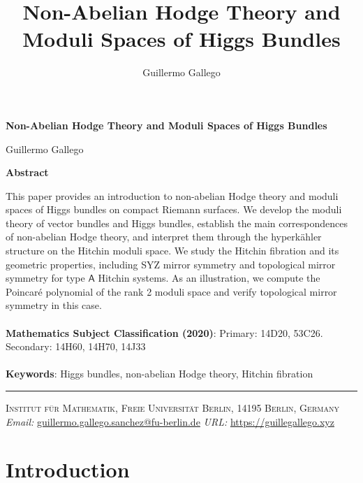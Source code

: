 \documentclass[12pt,a4paper]{amsbook}
\title{Non-Abelian Hodge Theory and Moduli Spaces of Higgs Bundles}
\author{Guillermo Gallego}
\theoremstyle{remark} \newtheorem{rmk}[thm]{Remark}
\theoremstyle{definition} \newtheorem{defn}[thm]{Definition}
\theoremstyle{definition} \newtheorem{ex}[thm]{Example}
\theoremstyle{definition} \newtheorem{ej}{Exercise}
\begin{document}
\begin{titlepage}
\setcounter{page}{1}
\thispagestyle{empty}
\begin{center}
\Huge \bfseries Non-Abelian Hodge Theory and Moduli Spaces of Higgs Bundles\par\vspace{2em}
\Large Guillermo Gallego \par\bigskip
\end{center}

\vspace{7em}

\begin{center}
\textbf{Abstract}
\end{center}
This paper provides an introduction to non-abelian Hodge theory and moduli spaces of Higgs bundles on compact Riemann surfaces. We develop the moduli theory of vector bundles and Higgs bundles, establish the main correspondences of non-abelian Hodge theory, and interpret them through the hyperkähler structure on the Hitchin moduli space. We study the Hitchin fibration and its geometric properties, including SYZ mirror symmetry and topological mirror symmetry for type $\mathsf{A}$ Hitchin systems. As an illustration, we compute the Poincaré polynomial of the rank 2 moduli space and verify topological mirror symmetry in this case. \\
\\
\textbf{Mathematics Subject Classification (2020)}: Primary: 14D20, 53C26. Secondary: 14H60, 14H70, 14J33 \\
\\
\textbf{Keywords}: Higgs bundles, non-abelian Hodge theory, Hitchin fibration


\vfill
\hrule \vspace{1em}
\begin{center}
\textsc{Institut für Mathematik, Freie Universität Berlin, 14195 Berlin, Germany} \vspace{1em}
\textit{Email:} \normalfont\href{mailto:guillermo.gallego.sanchez@fu-berlin.de}{guillermo.gallego.sanchez@fu-berlin.de} \hspace{1em}
\textit{URL:} \normalfont\href{https://guillegallego.xyz}{https://guillegallego.xyz}
\end{center}
\end{titlepage}

\tableofcontents
\chapter{Introduction}
\end{document}
